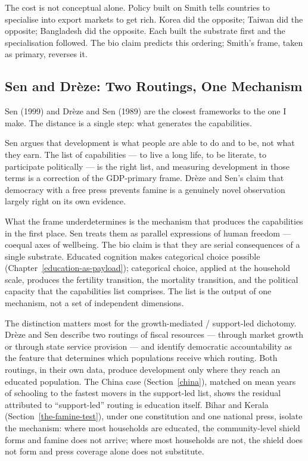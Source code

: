 \documentclass[12pt,letterpaper]{article}
\begin{document}
{The cost is not conceptual alone. Policy built on Smith tells countries to specialise into export markets to get rich. Korea did the opposite; Taiwan did the opposite; Bangladesh did the opposite. Each built the substrate first and the specialisation followed. The bio claim predicts this ordering; Smith's frame, taken as primary, reverses it.

\subsection{Sen and Drèze: Two Routings, One Mechanism}\label{sen-and-dreze-two-routings}

Sen (1999) and Drèze and Sen (1989) are the closest frameworks to the one I make. The distance is a single step: what generates the capabilities.

Sen argues that development is what people are able to do and to be, not what they earn. The list of capabilities --- to live a long life, to be literate, to participate politically --- is the right list, and measuring development in those terms is a correction of the GDP-primary frame. Drèze and Sen's claim that democracy with a free press prevents famine is a genuinely novel observation largely right on its own evidence.

What the frame underdetermines is the mechanism that produces the capabilities in the first place. Sen treats them as parallel expressions of human freedom --- coequal axes of wellbeing. The bio claim is that they are serial consequences of a single substrate. Educated cognition makes categorical choice possible (Chapter~\ref{education-as-payload}); categorical choice, applied at the household scale, produces the fertility transition, the mortality transition, and the political capacity that the capabilities list comprises. The list is the output of one mechanism, not a set of independent dimensions.

The distinction matters most for the growth-mediated / support-led dichotomy. Drèze and Sen describe two routings of fiscal resources --- through market growth or through state service provision --- and identify democratic accountability as the feature that determines which populations receive which routing. Both routings, in their own data, produce development only where they reach an educated population. The China case (Section~\ref{china}), matched on mean years of schooling to the fastest movers in the support-led list, shows the residual attributed to ``support-led'' routing is education itself. Bihar and Kerala (Section~\ref{the-famine-test}), under one constitution and one national press, isolate the mechanism: where most households are educated, the community-level shield forms and famine does not arrive; where most households are not, the shield does not form and press coverage alone does not substitute.

}
\end{document}

